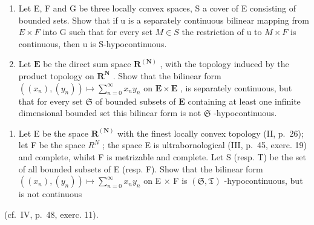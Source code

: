 \exercisegroup

\begin{enumerate}
\def\labelenumi{\arabic{enumi})}
\item
  Let E, F and G be three locally convex spaces, S a cover of E consisting of bounded sets. Show that if u is a separately continuous bilinear mapping from \(E \times F\) into G such that for every set \(M \in S\) the restriction of u to \(M \times F\) is continuous, then u is S-hypocontinuous.
\item
  Let \(\mathbf{E}\) be the direct sum space \(\mathbf{R}^{(\mathbf{N})}\) , with the topology induced by the product topology on \(\mathbf{R}^{\mathbf{N}}\) . Show that the bilinear form \(((x_n), (y_n)) \mapsto \sum_{n=0}^{\infty} x_n y_n\) on \(\mathbf{E} \times \mathbf{E}\) , is separately continuous, but that for every set \(\mathfrak{S}\) of bounded subsets of \(\mathbf{E}\) containing at least one infinite dimensional bounded set this bilinear form is not \(\mathfrak{S}\) -hypocontinuous.
\end{enumerate}


\begin{enumerate}
\def\labelenumi{\arabic{enumi})}
\setcounter{enumi}{2}
\tightlist
\item
  Let E be the space \(\mathbf{R}^{(\mathbf{N})}\) with the finest locally convex topology (II, p.~26); let F be the space \(R^{N}\) ; the space E is ultrabornological (III, p.~45, exerc. 19) and complete, whilst F is metrizable and complete. Let S (resp. T) be the set of all bounded subsets of E (resp. F). Show that the bilinear form \(((x_{n}), (y_{n})) \mapsto \sum_{n=0}^{\infty} x_{n} y_{n}\) on E × F is \((\mathfrak{S}, \mathfrak{T})\) -hypocontinuous, but is not continuous
\end{enumerate}

(cf.~IV, p.~48, exerc. 11).

